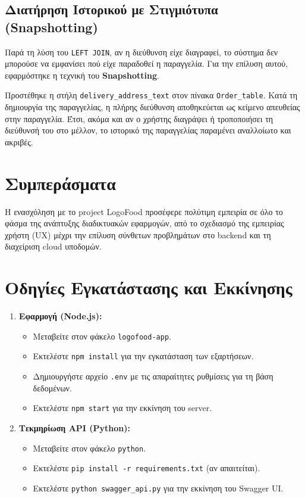 \documentclass[acmsmall,screen,nonacm]{acmart}
\begin{document}
	\subsection{Διατήρηση Ιστορικού με Στιγμιότυπα (Snapshotting)}
	Παρά τη λύση του \texttt{LEFT JOIN}, αν η διεύθυνση είχε διαγραφεί, το σύστημα δεν μπορούσε να εμφανίσει πού είχε παραδοθεί η παραγγελία. Για την επίλυση αυτού, εφαρμόστηκε η τεχνική του \textbf{Snapshotting}.

	Προστέθηκε η στήλη \texttt{delivery\_address\_text} στον πίνακα \texttt{Order\_table}. Κατά τη δημιουργία της παραγγελίας, η πλήρης διεύθυνση αποθηκεύεται ως κείμενο απευθείας στην παραγγελία. Έτσι, ακόμα και αν ο χρήστης διαγράψει ή τροποποιήσει τη διεύθυνσή του στο μέλλον, το ιστορικό της παραγγελίας παραμένει αναλλοίωτο και ακριβές.

	\section{Συμπεράσματα}
	Η ενασχόληση με το project LogoFood προσέφερε πολύτιμη εμπειρία σε όλο το φάσμα της ανάπτυξης διαδικτυακών εφαρμογών, από το σχεδιασμό της εμπειρίας χρήστη (UX) μέχρι την επίλυση σύνθετων προβλημάτων στο backend και τη διαχείριση cloud υποδομών.
	
	\section{Οδηγίες Εγκατάστασης και Εκκίνησης}
	\begin{enumerate}
		\item \textbf{Εφαρμογή (Node.js):}
		\begin{itemize}
			\item Μεταβείτε στον φάκελο \texttt{logofood-app}.
			\item Εκτελέστε \texttt{npm install} για την εγκατάσταση των εξαρτήσεων.
			\item Δημιουργήστε αρχείο \texttt{.env} με τις απαραίτητες ρυθμίσεις για τη βάση δεδομένων.
			\item Εκτελέστε \texttt{npm start} για την εκκίνηση του server.
		\end{itemize}
		\item \textbf{Τεκμηρίωση API (Python):}
		\begin{itemize}
			\item Μεταβείτε στον φάκελο \texttt{python}.
			\item Εκτελέστε \texttt{pip install -r requirements.txt} (αν απαιτείται).
			\item Εκτελέστε \texttt{python swagger\_api.py} για την εκκίνηση του Swagger UI.
		\end{itemize}
	\end{enumerate}
	
\end{document}
